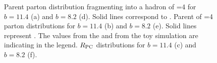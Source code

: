 \documentclass[12pt]{article}
\begin{document}
\begin{figure}[htbp]
   \caption{Parent parton distribution fragmenting into a hadron of \pt{}=4 \gevc{} for $b=11.4$ (a) and $b=8.2$ (d). 
   Solid lines correspond to . Parent of \pt{}=4 \gevc{} parton \mean{\zt} distributions for $b=11.4$ (b) and $b=8.2$ (e). 
   Solid lines represent . The \mean{\zt} values from the   and from the toy simulation are indicating 
   in the legend.  $R_{\rm PC}$ distributions for $b=11.4$ (c) and $b=8.2$ (f). 
   }  
\end{figure}
\end{document}
